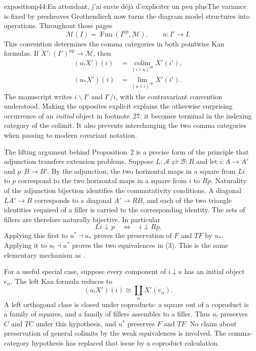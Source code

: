\begin{dcomment}{exposition}{p44:En attendant, j'ai envie déjà d'expliciter un peu plus}{The variance is fixed by presheaves}
Grothendieck now turns the diagram model structures into operations. Throughout these pages
\[
 \mathcal M(I)=\operatorname{Fun}(I^{\mathrm{op}},\mathcal M),
 \qquad u:I'\longrightarrow I.
\]
This convention determines the comma categories in both pointwise Kan formulas. If $X':(I')^{\mathrm{op}}\to\mathcal M$, then
\[
 \begin{aligned}
 (u_!X')(i)&=\operatorname*{colim}_{(i\downarrow u)^{\mathrm{op}}}X'(i'),\\
 (u_*X')(i)&=\operatorname*{lim}_{(u\downarrow i)^{\mathrm{op}}}X'(i').
 \end{aligned}
\]
The manuscript writes $i\backslash I'$ and $I'/i$, with the contravariant convention understood. Making the opposites explicit explains the otherwise surprising occurrence of an \emph{initial} object in footnote~27: it becomes terminal in the indexing category of the colimit. It also prevents interchanging the two comma categories when passing to modern covariant notation.

The lifting argument behind Proposition~2 is a precise form of the principle that adjunction transfers extension problems. Suppose $L:\mathcal A\rightleftarrows\mathcal B:R$ and let $i:A\to A'$ and $p:B\to B'$. By the adjunction, the two horizontal maps in a square from $Li$ to $p$ correspond to the two horizontal maps in a square from $i$ to $Rp$. Naturality of the adjunction bijection identifies the commutativity conditions. A diagonal $LA'\to B$ corresponds to a diagonal $A'\to RB$, and each of the two triangle identities required of a filler is carried to the corresponding identity. The sets of fillers are therefore naturally bijective. In particular
\[
 Li\mathrel{\perp}p\quad\Longleftrightarrow\quad i\mathrel{\perp}Rp.
\]
Applying this first to $u^*\dashv u_*$ proves the preservation of $F$ and $TF$ by $u_*$. Applying it to $u_!\dashv u^*$ proves the two equivalences in (3). This is the same elementary mechanism as \citet[Lemma~1.3.4]{Hovey1999}.

For a useful special case, suppose every component of $i\downarrow u$ has an initial object $e_\alpha$. The left Kan formula reduces to
\[
 (u_!X')(i)\cong\coprod_\alpha X'(e_\alpha).
\]
A left orthogonal class is closed under coproducts: a square out of a coproduct is a family of squares, and a family of fillers assembles to a filler. Thus $u_!$ preserves $C$ and $TC$ under this hypothesis, and $u^*$ preserves $F$ and $TF$. No claim about preservation of general colimits by the weak equivalences is involved. The comma-category hypothesis has replaced that issue by a coproduct calculation.
\end{dcomment}


